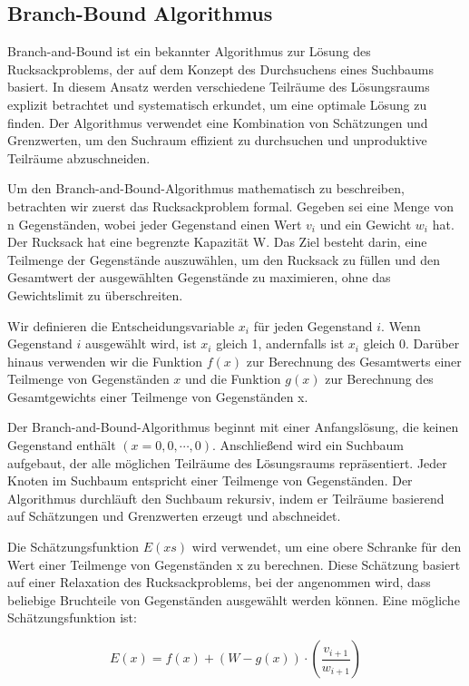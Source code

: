 \subsection{Branch-Bound Algorithmus}
Branch-and-Bound ist ein bekannter Algorithmus zur Lösung 
des Rucksackproblems, der auf dem Konzept des Durchsuchens 
eines Suchbaums basiert. In diesem Ansatz werden verschiedene 
Teilräume des Lösungsraums explizit betrachtet und systematisch 
erkundet, um eine optimale Lösung zu finden. Der Algorithmus 
verwendet eine Kombination von Schätzungen und Grenzwerten, 
um den Suchraum effizient zu durchsuchen und unproduktive 
Teilräume abzuschneiden.

Um den Branch-and-Bound-Algorithmus mathematisch zu 
beschreiben, betrachten wir zuerst das Rucksackproblem 
formal. Gegeben sei eine Menge von n Gegenständen, wobei 
jeder Gegenstand einen Wert $v_i$ und ein Gewicht $w_i$ hat. 
Der Rucksack hat eine begrenzte Kapazität W. Das Ziel 
besteht darin, eine Teilmenge der Gegenstände auszuwählen, 
um den Rucksack zu füllen und den Gesamtwert der ausgewählten 
Gegenstände zu maximieren, ohne das Gewichtslimit zu 
überschreiten.

Wir definieren die Entscheidungsvariable $x_i$ für jeden 
Gegenstand $i$. Wenn Gegenstand $i$ ausgewählt wird, ist $x_i$ 
gleich 1, andernfalls ist $x_i$ gleich 0. Darüber hinaus 
verwenden wir die Funktion $f(x)$ zur Berechnung des 
Gesamtwerts einer Teilmenge von Gegenständen $x$ und die 
Funktion $g(x)$ zur Berechnung des Gesamtgewichts einer 
Teilmenge von Gegenständen x.

Der Branch-and-Bound-Algorithmus beginnt mit einer 
Anfangslösung, die keinen Gegenstand enthält 
$(x = {0, 0, \cdots, 0})$. Anschließend wird ein Suchbaum 
aufgebaut, der alle möglichen Teilräume des Lösungsraums 
repräsentiert. Jeder Knoten im Suchbaum entspricht einer 
Teilmenge von Gegenständen. Der Algorithmus durchläuft den 
Suchbaum rekursiv, indem er Teilräume basierend auf 
Schätzungen und Grenzwerten erzeugt und abschneidet.

Die Schätzungsfunktion $E(xs)$ wird verwendet, um eine obere 
Schranke für den Wert einer Teilmenge von Gegenständen x zu 
berechnen. Diese Schätzung basiert auf einer Relaxation des 
Rucksackproblems, bei der angenommen wird, dass beliebige 
Bruchteile von Gegenständen ausgewählt werden können. Eine 
mögliche Schätzungsfunktion ist:

\begin{equation}
    E(x) = f(x) + (W - g(x)) \cdot \left(\frac{v_{i+1}}{w_{i+1}}\right)
\end{equation}

